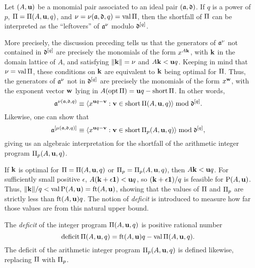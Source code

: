 \documentclass[11pt]{amsart}
\newcommand{\short}{\operatorname{short}}
\newcommand{\deficit}{\operatorname{deficit}}
\begin{document}
\begin{remark}
\label{shortfall motivation: R}
Let $(A,\mathbf{u})$ be a monomial pair associated to an ideal pair $(\mathfrak{a},\mathfrak{d})$.
If $q$ is a power of $p$, $\Pi = \Pi(A,\mathbf{u},q)$, and $\nu = \nu(\mathfrak{a},\mathfrak{d},q) = \operatorname{val} \Pi$, then the shortfall of $\Pi$ can be interpreted as the ``leftovers'' of $\mathfrak{a}^\nu$ modulo $\mathfrak{d}^{[q]}$.

More precisely, the discussion preceding  tells us that the generators of $\mathfrak{a}^{\nu}$ not contained in $\mathfrak{d}^{[q]}$ are precisely the monomials of the form $x^{A \mathbf{k}}$, with $\mathbf{k}$ in the domain lattice of $A$, and satisfying $\| \mathbf{k} \| = \nu$ and $A\mathbf{k}<\mathbf{u}q$.  
Keeping in mind that $\nu= \operatorname{val} \Pi$, these conditions on $\mathbf{k}$ are equivalent to $\mathbf{k}$ being optimal for $\Pi$.
Thus, the generators of $\mathfrak{a}^{\nu}$ not in $\mathfrak{d}^{[q]}$ are precisely the monomials of the form $x^{\mathbf{w}}$, with the exponent vector $\mathbf{w}$ lying in $A(\opt \IP) = \vv{u}q - \short \IP$.
In other words,
\begin{equation}
\label{algebraic shortfall PI general: e}
 \ideala^{\nu(\ideala, \ideald, q)} \equiv \ideal{x^{\vv{u}q-\vv{v}}: \vv{v} \in \short \IP(A,\vv{u},q)} \bmod \ideald^{[q]}.
 \end{equation}
Likewise, one can show that
\begin{equation}
\label{algebraic shortfall PI_p general: e}
\ideala^{[\mu(\ideala, \ideald, q)]} \equiv \ideal{x^{\vv{u}q-\vv{v}}: \vv{v} \in \short \IP_p(A,\vv{u},q)} \bmod \ideald^{[q]},
\end{equation}
giving us an algebraic interpretation for the shortfall of the arithmetic integer program $\Pi_p(A,\mathbf{u},q)$.
\end{remark}

If $\mathbf{k}$ is optimal for $\Pi = \Pi(A,\mathbf{u},q)$ or $\Pi_p = \Pi_p(A,\mathbf{u},q)$, then $A\mathbf{k} < \mathbf{u}q$.
For sufficiently small positive $\epsilon$, $A(\mathbf{k}+\epsilon\mathbf{1}) < \mathbf{u}q$, so $(\mathbf{k}+\epsilon \mathbf{1})/q$ is feasible for $\mathrm{P}(A,\mathbf{u})$.
Thus, $\| \mathbf{k} \|/q < \operatorname{val} \mathrm{P}(A,\mathbf{u}) = \operatorname{ft}(A, \mathbf{u})$, showing that the values of $\Pi$ and $\Pi_p$ are strictly less than $\operatorname{ft}(A, \mathbf{u})q$.
The notion of \emph{deficit} is introduced to measure how far those values are from this natural upper bound.

\begin{definition}
   The \emph{deficit} of the integer program $\Pi(A, \mathbf{u}, q)$ is positive rational number
   \[ \deficit \IP(A, \vv{u}, q) = \ft{A}{\vv{u}}q - \val \IP(A, \vv{u}, q).\]
   The deficit of the arithmetic integer program $\Pi_p(A, \mathbf{u}, q)$ is defined likewise, replacing $\Pi$ with $\Pi_p$.
\end{definition}
\end{document}
